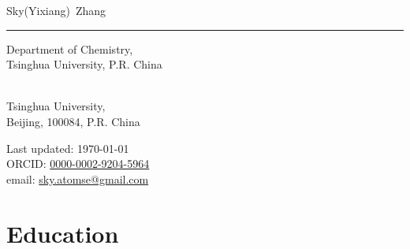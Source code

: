 \documentclass[11pt, a4paper]{article}
\makeatletter
\newcommand{\FirstName}{Sky(Yixiang)}
\newcommand{\LastName}{Zhang}
\newcommand{\MyName}{\FirstName\ \LastName}
\newcommand{\Email}{sky.atomse@gmail.com}
\newcommand{\ORCID}{0000-0002-9204-5964}
\newcommand{\Affiliation}{
    Department of Chemistry, 
    \\
    Tsinghua University, P.R. China
}
\newcommand{\Address}{
    Tsinghua University,
    \\
    Beijing, 100084, P.R. China
}
\newcommand{\Duration}[2]{\fontsize{10pt}{0}\selectfont #1--#2}
\newcommand{\Ongoing}{}
\makeatother
\begin{document}
\thispagestyle{empty}

{\fontsize{24pt}{0}\selectfont\MyName}\\[-0.1cm]
\rule{\textwidth}{0.2pt}
\begin{minipage}[t]{0.595\textwidth}
    \Affiliation
    \\
    \Address
\end{minipage}
\begin{minipage}[t]{0.4\textwidth}
    \begin{flushright}
		Last updated: \monthyear\today
		\\
        ORCID: \href{https://orcid.org/\ORCID}{\ORCID}
        \\
        email: \href{mailto:\Email}{\Email}
    \end{flushright}
\end{minipage}

% 


\section*{Education}
\end{document}
